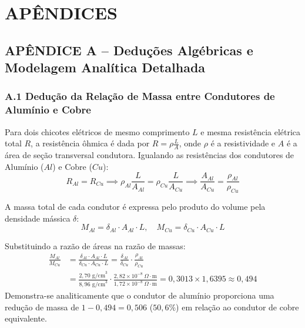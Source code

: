 
\newpage
\section*{APÊNDICES}

\subsection*{APÊNDICE A -- Deduções Algébricas e Modelagem Analítica Detalhada}

\subsubsection*{A.1 Dedução da Relação de Massa entre Condutores de Alumínio e Cobre}

Para dois chicotes elétricos de mesmo comprimento $L$ e mesma resistência elétrica total $R$, a resistência ôhmica é dada por $R = \rho \frac{L}{A}$, onde $\rho$ é a resistividade e $A$ é a área de seção transversal condutora. Igualando as resistências dos condutores de Alumínio ($Al$) e Cobre ($Cu$):
\begin{equation}
    R_{Al} = R_{Cu} \implies \rho_{Al} \frac{L}{A_{Al}} = \rho_{Cu} \frac{L}{A_{Cu}} \implies \frac{A_{Al}}{A_{Cu}} = \frac{\rho_{Al}}{\rho_{Cu}}
\end{equation}

A massa total de cada condutor é expressa pelo produto do volume pela densidade mássica $\delta$:
\begin{equation}
    M_{Al} = \delta_{Al} \cdot A_{Al} \cdot L, \quad M_{Cu} = \delta_{Cu} \cdot A_{Cu} \cdot L
\end{equation}

Substituindo a razão de áreas na razão de massas:
\begin{align}
    \frac{M_{Al}}{M_{Cu}} &= \frac{\delta_{Al} \cdot A_{Al} \cdot L}{\delta_{Cu} \cdot A_{Cu} \cdot L} = \frac{\delta_{Al}}{\delta_{Cu}} \cdot \frac{\rho_{Al}}{\rho_{Cu}} \nonumber \\
    &= \frac{2{,}70\text{ g/cm}^3}{8{,}96\text{ g/cm}^3} \cdot \frac{2{,}82 \times 10^{-8}\ \Omega\cdot\text{m}}{1{,}72 \times 10^{-8}\ \Omega\cdot\text{m}} = 0{,}3013 \times 1,6395 \approx 0{,}494
\end{align}
Demonstra-se analiticamente que o condutor de alumínio proporciona uma redução de massa de $1 - 0{,}494 = 0{,}506$ ($50{,}6\%$) em relação ao condutor de cobre equivalente.

